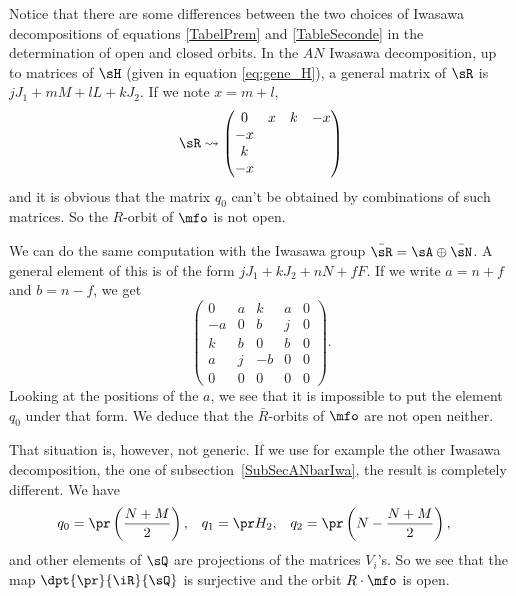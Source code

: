 Notice that there are some differences between the two choices of Iwasawa decompositions of equations \eqref{TabelPrem} and \eqref{TableSeconde} in the determination of open and closed orbits. In the $AN$ Iwasawa decomposition, up to matrices of $\sH$ (given in equation \eqref{eq:gene_H}), a general matrix of $\sR$ is $jJ_1+mM+lL+kJ_2$. If we note $x=m+l$,
\begin{equation} \label{eq:geneR}
\sR\leadsto
\begin{pmatrix}
0&x&k&-x\\
-x\\
k\\
-x
\end{pmatrix}
\end{equation}
and it is obvious that the matrix $q_0$ can't be obtained by combinations of such matrices. So the $R$-orbit of $\mfo$ is not open.

We can do the same computation with the Iwasawa group $\bar\sR=\sA\oplus\bar\sN$. A general element of this is of the form $jJ_1+kJ_2+nN+fF$. If we write $a=n+f$ and $b=n-f$, we get
\begin{equation}
	\begin{pmatrix}
 0	&	a	&	k	&	a	&	0\\
 -a	&	0	&	b	&	j	&	0\\
 k	&	b	&	0	&	b	&	0\\
 a	&	j	&	-b	&	0	&	0\\
0	&	0	&	0	&	0	&	0
 \end{pmatrix}.
\end{equation}
Looking at the positions of the $a$, we see that it is impossible to put the element $q_0$ under that form. We deduce that the $\bar R$-orbits of $\mfo$ are not open neither.

That situation is, however, not generic. If we use for example the other Iwasawa decomposition, the one of subsection~\ref{SubSecANbarIwa}, the result is completely different. We have
\begin{align}
  q_{0}&=\pr\left( \frac{ N+M }{ 2 } \right),
&q_{1}&=\pr H_{2},
&q_{2}&=\pr\left( N-\frac{ N+M }{ 2 } \right),
\end{align}
and other elements of $\sQ$ are projections of the matrices $V_{i}$'s.  So we see that the map $\dpt{\pr}{\iR}{\sQ}$ is surjective and \label{pg:mfo_ouvert} the orbit $R\cdot\mfo$ is open.

